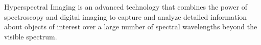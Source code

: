 Hyperspectral Imaging is an advanced technology that combines the power of spectroscopy and digital imaging to capture and analyze detailed information about objects of interest over a large number of spectral wavelengths beyond the visible spectrum. 